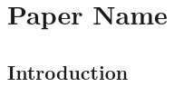 
\chapter{Paper Name}
\label{ch:paper_name}


\section{Introduction}
\label{ch2:sec:introduction}

% 
% 
% 
% 


